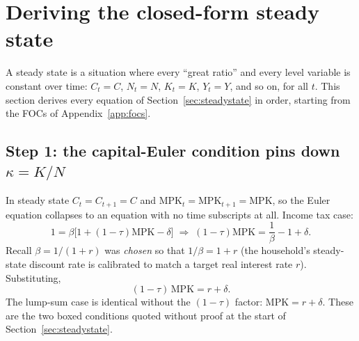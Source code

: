 \documentclass[11pt]{article}
\newcommand{\eq}[1]{\begin{equation}#1\end{equation}}
\begin{document}
\section{Deriving the closed-form steady state}
\label{app:steadystate}

A steady state is a situation where every ``great ratio'' and every level
variable is constant over time: $C_t=C$, $N_t=N$, $K_t=K$, $Y_t=Y$, and so
on, for all $t$. This section derives every equation of
Section~\ref{sec:steadystate} in order, starting from the FOCs of
Appendix~\ref{app:focs}.

\subsection{Step 1: the capital-Euler condition pins down $\kappa=K/N$}

In steady state $C_t=C_{t+1}=C$ and $\mathrm{MPK}_t=\mathrm{MPK}_{t+1}=\mathrm{MPK}$,
so the Euler equation collapses to an equation with no time subscripts at
all. Income tax case:
\eq{ 1 = \beta\big[1+(1-\tau)\mathrm{MPK}-\delta\big] \;\Longrightarrow\; (1-\tau)\mathrm{MPK} = \frac{1}{\beta}-1+\delta. }
Recall $\beta=1/(1+r)$ was \emph{chosen} so that $1/\beta=1+r$ (the
household's steady-state discount rate is calibrated to match a target
real interest rate $r$). Substituting,
\eq{ \boxed{(1-\tau)\,\mathrm{MPK} = r+\delta.} }
The lump-sum case is identical without the $(1-\tau)$ factor:
$\boxed{\mathrm{MPK}=r+\delta.}$ These are the two boxed conditions quoted
without proof at the start of Section~\ref{sec:steadystate}.
\end{document}
